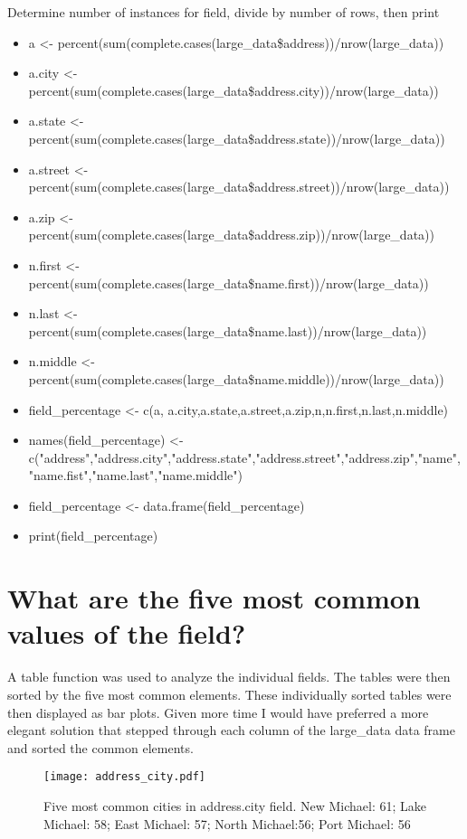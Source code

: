 \documentclass[12pt,fleqn]{report} %
\begin{document}
\begin{remark}
 Determine number of instances for field, divide by number of rows, then print  
    \begin{itemize}
    	\item a <- percent(sum(complete.cases(large\_data\$address))/nrow(large\_data))
    	\item a.city <- percent(sum(complete.cases(large\_data\$address.city))/nrow(large\_data))
    	\item a.state <- percent(sum(complete.cases(large\_data\$address.state))/nrow(large\_data))
    	\item a.street <- percent(sum(complete.cases(large\_data\$address.street))/nrow(large\_data))
    	\item a.zip <- percent(sum(complete.cases(large\_data\$address.zip))/nrow(large\_data))
    	\item n.first <- percent(sum(complete.cases(large\_data\$name.first))/nrow(large\_data))
    	\item n.last <- percent(sum(complete.cases(large\_data\$name.last))/nrow(large\_data))
    	\item n.middle <- percent(sum(complete.cases(large\_data\$name.middle))/nrow(large\_data))
    	\item field\_percentage <- c(a, a.city,a.state,a.street,a.zip,n,n.first,n.last,n.middle)
    	\item names(field\_percentage) <- c("address","address.city","address.state","address.street","address.zip","name","name.fist","name.last","name.middle")
    	\item field\_percentage <- data.frame(field\_percentage)
    	\item print(field\_percentage)
    \end{itemize}
\end{remark}

\section{What are the five most common values of the field?}
A table function was used to analyze the individual fields. The tables were then sorted by the five most common elements. These individually sorted tables were then displayed as bar plots. Given more time I would have preferred a more elegant solution that stepped through each column of the large\_data data frame and sorted the common elements. 

\begin{figure}[h]
    \centering
    \texttt{[image: address\_city.pdf]}
    \caption{Five most common cities in address.city field. New Michael: 61; Lake Michael: 58; East Michael: 57; North Michael:56; Port Michael: 56}
    \label{fig:address.city}
\end{figure}
\end{document}
